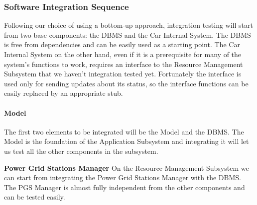 \documentclass[english]{article}
\begin{document}
\subsubsection{Software Integration Sequence}

Following our choice of using a bottom-up approach, integration testing will start from two base components: the DBMS and the Car Internal System.
The DBMS is free from dependencies and can be easily used as a starting point.
The Car Internal System on the other hand, even if it is a prerequisite for many of the system's functions to work, requires an interface to the Resource Management Subsystem that we haven't integration tested yet. Fortunately the interface is used only for sending updates about its status, so the interface functions can be easily replaced by an appropriate stub.


\paragraph{Model}
The first two elements to be integrated will be the Model and the DBMS.
The Model is the foundation of the Application Subsystem and integrating it will let us test all the other components in the subsystem.

\begin{figure}[H]
	\centering
\end{figure}

\textbf{Power Grid Stations Manager}
On the Resource Management Subsystem we can start from integrating the Power Grid Stations Manager with the DBMS. 
The PGS Manager is almost fully independent from the other components and can be tested easily.
\begin{figure}[H]
	\centering
\end{figure}
\end{document}

